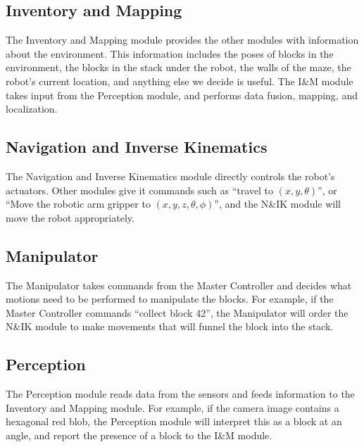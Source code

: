 \documentclass[letterpaper,11pt]{article}
\begin{document}
\subsection{Inventory and Mapping}
The Inventory and Mapping module provides the other modules with information about the environment.
This information includes the poses of blocks in the environment,
the blocks in the stack under the robot,
the walls of the maze,
the robot's current location,
and anything else we decide is useful.
The I\&M module takes input from the Perception module, and performs data fusion, mapping, and localization.

\subsection{Navigation and Inverse Kinematics}
The Navigation and Inverse Kinematics module directly controls the robot's actuators.
Other modules give it commands such as ``travel to $(x, y, \theta)$'',
or ``Move the robotic arm gripper to $(x, y, z, \theta, \phi)$'',
and the N\&IK module will move the robot appropriately.

\subsection{Manipulator}
The Manipulator takes commands from the Master Controller
and decides what motions need to be performed to manipulate the blocks.
For example, if the Master Controller commands ``collect block 42'',
the Manipulator will order the N\&IK module to make movements that will funnel the block into the stack.

\subsection{Perception}
The Perception module reads data from the sensors and feeds information to the Inventory and Mapping module.
For example, if the camera image contains a hexagonal red blob,
the Perception module will interpret this as a block at an angle,
and report the presence of a block to the I\&M module.
\end{document}
